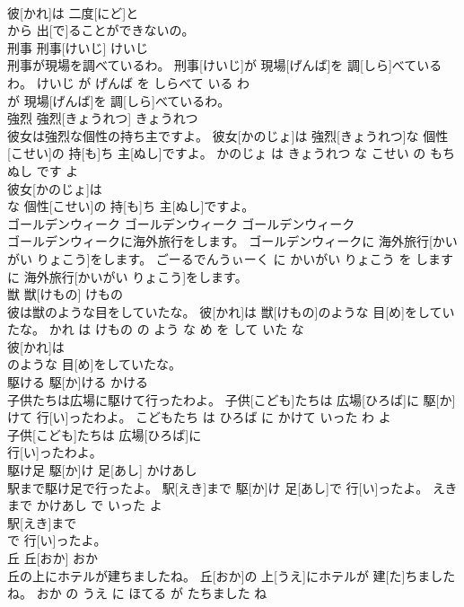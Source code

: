\documentclass[8pt]{extreport}
\begin{document}
\begin{CJK}{UTF8}{min}
\\	彼[かれ]は 二度[にど]と
\\	から 出[で]ることができないの。			
\\	刑事	刑事[けいじ]	けいじ	
\\	刑事が現場を調べているわ。	刑事[けいじ]が 現場[げんば]を 調[しら]べているわ。	けいじ が げんば を しらべて いる わ	
\\	が 現場[げんば]を 調[しら]べているわ。			
\\	強烈	強烈[きょうれつ]	きょうれつ	
\\	彼女は強烈な個性の持ち主ですよ。	彼女[かのじょ]は 強烈[きょうれつ]な 個性[こせい]の 持[も]ち 主[ぬし]ですよ。	かのじょ は きょうれつ な こせい の もちぬし です よ	
\\	彼女[かのじょ]は
\\	な 個性[こせい]の 持[も]ち 主[ぬし]ですよ。			
\\	ゴールデンウィーク	ゴールデンウィーク	ゴールデンウィーク	
\\	ゴールデンウィークに海外旅行をします。	ゴールデンウィークに 海外旅行[かいがい りょこう]をします。	ごーるでんうぃーく に かいがい りょこう を します	
\\	に 海外旅行[かいがい りょこう]をします。			
\\	獣	獣[けもの]	けもの	
\\	彼は獣のような目をしていたな。	彼[かれ]は 獣[けもの]のような 目[め]をしていたな。	かれ は けもの の よう な め を して いた な	
\\	彼[かれ]は
\\	のような 目[め]をしていたな。			
\\	駆ける	駆[か]ける	かける	
\\	子供たちは広場に駆けて行ったわよ。	子供[こども]たちは 広場[ひろば]に 駆[か]けて 行[い]ったわよ。	こどもたち は ひろば に かけて いった わ よ	
\\	子供[こども]たちは 広場[ひろば]に
\\	行[い]ったわよ。			
\\	駆け足	駆[か]け 足[あし]	かけあし	
\\	駅まで駆け足で行ったよ。	駅[えき]まで 駆[か]け 足[あし]で 行[い]ったよ。	えき まで かけあし で いった よ	
\\	駅[えき]まで
\\	で 行[い]ったよ。			
\\	丘	丘[おか]	おか	
\\	丘の上にホテルが建ちましたね。	丘[おか]の 上[うえ]にホテルが 建[た]ちましたね。	おか の うえ に ほてる が たちました ね	

\end{CJK}
\end{document}
